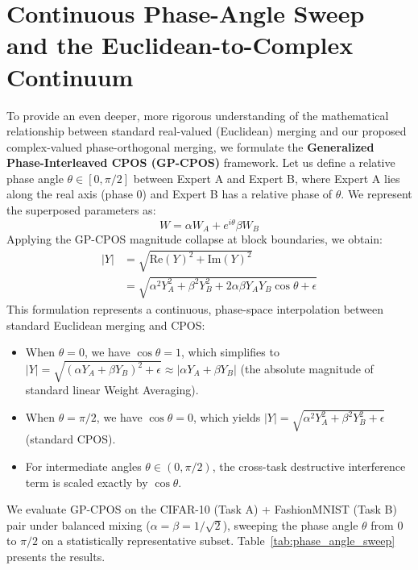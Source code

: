 \documentclass{article}
\theoremstyle{plain}
\theoremstyle{definition}
\theoremstyle{remark}
\begin{document}
\section{Continuous Phase-Angle Sweep and the Euclidean-to-Complex Continuum}
\label{subsec:phase_sweep}
To provide an even deeper, more rigorous understanding of the mathematical relationship between standard real-valued (Euclidean) merging and our proposed complex-valued phase-orthogonal merging, we formulate the \textbf{Generalized Phase-Interleaved CPOS (GP-CPOS)} framework. Let us define a relative phase angle $\theta \in [0, \pi/2]$ between Expert A and Expert B, where Expert A lies along the real axis (phase 0) and Expert B has a relative phase of $\theta$. We represent the superposed parameters as:
\begin{equation}
W = \alpha W_A + e^{i \theta} \beta W_B
\end{equation}
Applying the GP-CPOS magnitude collapse at block boundaries, we obtain:
\begin{align}
|Y| &= \sqrt{\text{Re}(Y)^2 + \text{Im}(Y)^2} \nonumber \\
    &= \sqrt{\alpha^2 Y_A^2 + \beta^2 Y_B^2 + 2 \alpha \beta Y_A Y_B \cos \theta + \epsilon}
\end{align}
This formulation represents a continuous, phase-space interpolation between standard Euclidean merging and CPOS:
\begin{itemize}
\item When $\theta = 0$, we have $\cos \theta = 1$, which simplifies to $|Y| = \sqrt{(\alpha Y_A + \beta Y_B)^2 + \epsilon} \approx |\alpha Y_A + \beta Y_B|$ (the absolute magnitude of standard linear Weight Averaging).
\item When $\theta = \pi/2$, we have $\cos \theta = 0$, which yields $|Y| = \sqrt{\alpha^2 Y_A^2 + \beta^2 Y_B^2 + \epsilon}$ (standard CPOS).
\item For intermediate angles $\theta \in (0, \pi/2)$, the cross-task destructive interference term is scaled exactly by $\cos \theta$.
\end{itemize}

We evaluate GP-CPOS on the CIFAR-10 (Task A) + FashionMNIST (Task B) pair under balanced mixing ($\alpha = \beta = 1/\sqrt{2}$), sweeping the phase angle $\theta$ from $0$ to $\pi/2$ on a statistically representative subset. Table~\ref{tab:phase_angle_sweep} presents the results.
\end{document}
